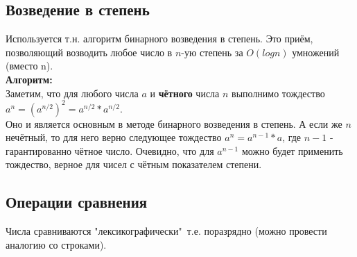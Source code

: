 \subsection{Возведение в степень}
Используется т.н. алгоритм бинарного возведения в степень. Это приём, позволяющий возводить любое число в $n$-ую степень за $O(log{n})$ умножений (вместо n). 
\\{\bfseries Алгоритм:}
\\Заметим, что для любого числа $a$ и {\bfseries чётного} числа $n$ выполнимо тождество $a^n = (a^{n/2})^2 = a^{n/2} * a^{n/2}$.
\\Оно и является основным в методе бинарного возведения в степень. А если же $n$ нечётный, то для него верно следующее тождество $a^n = a^{n-1}*a$, где $n-1$
- гарантированно чётное число. Очевидно, что для $a^{n-1}$ можно будет применить тождество, верное для чисел с чётным показателем степени.

\subsection{Операции сравнения}
Числа сравниваются "лексикографически"\, т.е. поразрядно (можно провести аналогию со строками).


\pagebreak
